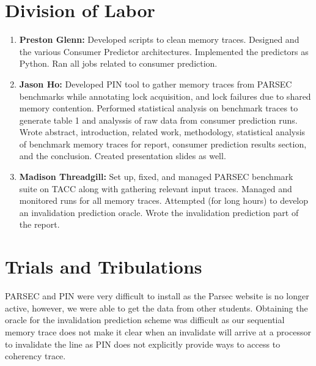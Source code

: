 \section{Division of Labor}
    \begin{enumerate}
        \item \textbf{Preston Glenn:} Developed scripts to clean memory traces. Designed and the various Consumer Predictor architectures. Implemented the predictors as Python. Ran all jobs related to consumer prediction.

        \item \textbf{Jason Ho:} Developed PIN tool to gather memory traces from PARSEC benchmarks while annotating lock acquisition, and lock failures due to shared memory contention. Performed statistical analysis on benchmark traces to generate table 1 and analyssis of raw data from consumer prediction runs. Wrote abstract, introduction, related work, methodology, statistical analysis of benchmark memory traces for report, consumer prediction results section, and the conclusion. Created presentation slides as well.
     

        \item \textbf{Madison Threadgill:} Set up, fixed, and managed PARSEC benchmark suite on TACC along with gathering relevant input traces. Managed and monitored runs for all memory traces. Attempted (for long hours) to develop an invalidation prediction oracle. Wrote the invalidation prediction part of the report.
    \end{enumerate}

\section{Trials and Tribulations}
    PARSEC and PIN were very difficult to install as the Parsec website is no longer active, however, we were able to get the data from other students. Obtaining the oracle for the invalidation prediction scheme was difficult as our sequential memory trace does not make it clear when an invalidate will arrive at a processor to invalidate the line as PIN does not explicitly provide ways to access to coherency trace.
    
